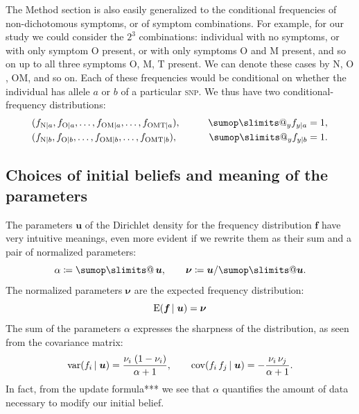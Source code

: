 \documentclass[\ifafour a4paper,12pt,\else a5paper,10pt,\fi%
onecolumn,oneside,article,%
british%
]{memoir}
\makeatletter
\theoremstyle{remark}
\theoremstyle{innote}
\def\sum{\DOTSI\sumop\slimits@}
\newcommand*{\defd}{\coloneqq}
\newcommand*{\E}{\mathrm{E}}
\renewcommand*{\|}[1][]{\nonscript\,#1\vert\nonscript\;\mathopen{}}
\newcommand*{\tsum}{\mathop{\textstyle\sum}\nolimits}
\DeclareMathOperator{\cov}{cov}
\DeclareMathOperator{\var}{var}
\newcommand*{\snp}{\textsc{snp}}
\newcommand*{\ya}{a}
\newcommand*{\yb}{b}
\newcommand*{\ysO}{\textrm{N}}%
\newcommand*{\ysA}{\textrm{O}}%
\newcommand*{\ysB}{\textrm{M}}%
\newcommand*{\ysC}{\textrm{T}}%
\newcommand*{\yA}{\alpha}
\newcommand*{\yqq}{\nu}
\newcommand*{\yq}{\bm{\yqq}}
\newcommand*{\yu}{\bm{u}}
\newcommand*{\yf}{\bm{f}}
\newcommand*{\ysum}{\tsum}
\makeatother
\begin{document}
The Method section is also easily generalized to the conditional
frequencies of non-dichotomous symptoms, or of symptom combinations. For
example, for our study we could consider the $2^3$ combinations: individual
with no symptoms, or with only symptom $\ysA$ present, or with only
symptoms $\ysA$ and $\ysB$ present, and so on up to all three symptoms
$\ysA$, $\ysB$, $\ysC$ present. We can denote these cases by $\ysO$,
$\ysA$, $\ysA\ysB$, and so on. Each of these frequencies would be
conditional on whether the individual has allele $\ya$ or $\yb$ of a
particular \snp. We thus have two conditional-frequency distributions:
\begin{equation}
  \label{eq:f_distr_symptom_combo}
  \begin{aligned}
    &(f_{\ysO\|\ya},f_{\ysA\|\ya},\dotsc,f_{\ysA\ysB\|\ya},\dotsc,f_{\ysA\ysB\ysC\|\ya}),
    \qquad&\sum_{y} f_{y\|\ya} =1,
      \\
    &(f_{\ysO\|\yb},f_{\ysA\|\yb},\dotsc,f_{\ysA\ysB\|\yb},\dotsc,f_{\ysA\ysB\ysC\|\yb}),
    \qquad&\sum_{y} f_{y\|\yb} =1.
  \end{aligned}
\end{equation}



\subsection{Choices of initial beliefs and meaning of the parameters}
\label{sec:choices_prior_info}


The parameters $\yu$ of the Dirichlet density for the frequency
distribution $\yf$ have very intuitive meanings, even more evident if we
rewrite them as their sum and a pair of normalized parameters:
\begin{equation}
  \label{eq:rewrite_params}
  \yA \defd \ysum\yu,
  \qquad
  \yq\defd\yu/\sum\yu.
\end{equation}
The normalized parameters $\yq$ are the expected frequency distribution:
\begin{equation}
  \label{eq:meaning_normalized_parameters}
  \E(\yf \| \yu) = \yq
\end{equation}
The sum of the parameters $\yA$ expresses the sharpness of the
distribution, as seen from the covariance matrix:
\begin{equation}
  \label{eq:variances_covariances}
  \var(f_i \| \yu) = \frac{\yqq_i\;(1-\yqq_i)}{\yA+1},
  \qquad
  \cov(f_i\,f_j \| \yu) = -\frac{\yqq_i\,\yqq_j}{\yA+1}.
\end{equation}
In fact, from the update formula*** we see that $\yA$ quantifies the amount
of data necessary to modify our initial belief.
\end{document}
